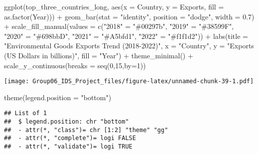 \documentclass[
]{article}
\newenvironment{Shaded}{\begin{snugshade}}{\end{snugshade}}
\newcommand{\AttributeTok}[1]{\textcolor[rgb]{0.77,0.63,0.00}{#1}}
\newcommand{\DecValTok}[1]{\textcolor[rgb]{0.00,0.00,0.81}{#1}}
\newcommand{\FloatTok}[1]{\textcolor[rgb]{0.00,0.00,0.81}{#1}}
\newcommand{\FunctionTok}[1]{\textcolor[rgb]{0.00,0.00,0.00}{#1}}
\newcommand{\NormalTok}[1]{#1}
\newcommand{\OtherTok}[1]{\textcolor[rgb]{0.56,0.35,0.01}{#1}}
\newcommand{\SpecialCharTok}[1]{\textcolor[rgb]{0.00,0.00,0.00}{#1}}
\newcommand{\StringTok}[1]{\textcolor[rgb]{0.31,0.60,0.02}{#1}}
\begin{document}
\begin{Shaded}
\begin{Highlighting}[]
\FunctionTok{ggplot}\NormalTok{(top\_three\_countries\_long, }\FunctionTok{aes}\NormalTok{(}\AttributeTok{x =}\NormalTok{ Country, }\AttributeTok{y =}\NormalTok{ Exports, }\AttributeTok{fill =} \FunctionTok{as.factor}\NormalTok{(Year))) }\SpecialCharTok{+}
  \FunctionTok{geom\_bar}\NormalTok{(}\AttributeTok{stat =} \StringTok{"identity"}\NormalTok{, }\AttributeTok{position =} \StringTok{"dodge"}\NormalTok{, }\AttributeTok{width =} \FloatTok{0.7}\NormalTok{) }\SpecialCharTok{+}
  \FunctionTok{scale\_fill\_manual}\NormalTok{(}\AttributeTok{values =} \FunctionTok{c}\NormalTok{(}\StringTok{"2018"} \OtherTok{=} \StringTok{"\#00297b"}\NormalTok{, }\StringTok{"2019"} \OtherTok{=} \StringTok{"\#38599F"}\NormalTok{, }\StringTok{"2020"} \OtherTok{=} \StringTok{"\#698bbD"}\NormalTok{, }\StringTok{"2021"} \OtherTok{=} \StringTok{"\#A5bfd1"}\NormalTok{, }\StringTok{"2022"} \OtherTok{=} \StringTok{"\#f1f1d2"}\NormalTok{)) }\SpecialCharTok{+}
  \FunctionTok{labs}\NormalTok{(}\AttributeTok{title =} \StringTok{"Environmental Goods Exports Trend (2018{-}2022)"}\NormalTok{,}
       \AttributeTok{x =} \StringTok{"Country"}\NormalTok{,}
       \AttributeTok{y =} \StringTok{"Exports (US Dollars in billions)"}\NormalTok{,}
       \AttributeTok{fill =} \StringTok{"Year"}\NormalTok{) }\SpecialCharTok{+}
  \FunctionTok{theme\_minimal}\NormalTok{() }\SpecialCharTok{+}
  \FunctionTok{scale\_y\_continuous}\NormalTok{(}\AttributeTok{breaks =} \FunctionTok{seq}\NormalTok{(}\DecValTok{0}\NormalTok{,}\DecValTok{15}\NormalTok{,}\AttributeTok{by=}\DecValTok{1}\NormalTok{))}
\end{Highlighting}
\end{Shaded}

\texttt{[image: Group06\_IDS\_Project\_files/figure-latex/unnamed-chunk-39-1.pdf]}

\begin{Shaded}
\begin{Highlighting}[]
  \FunctionTok{theme}\NormalTok{(}\AttributeTok{legend.position =} \StringTok{"bottom"}\NormalTok{)}
\end{Highlighting}
\end{Shaded}

\begin{verbatim}
## List of 1
##  $ legend.position: chr "bottom"
##  - attr(*, "class")= chr [1:2] "theme" "gg"
##  - attr(*, "complete")= logi FALSE
##  - attr(*, "validate")= logi TRUE
\end{verbatim}
\end{document}
